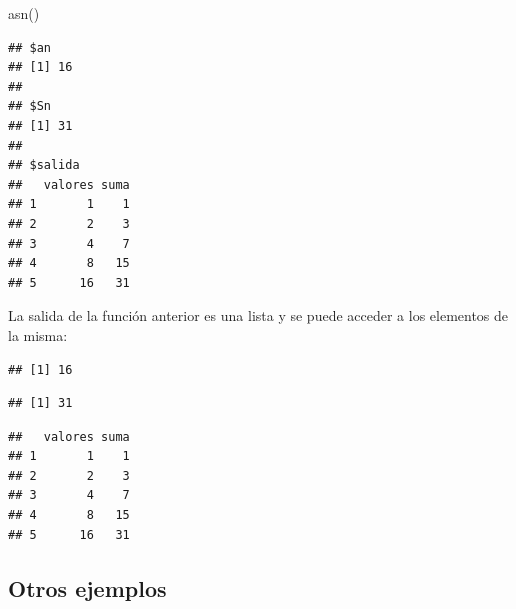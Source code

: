 \documentclass[
]{book}
\newenvironment{Shaded}{\begin{snugshade}}{\end{snugshade}}
\newcommand{\FunctionTok}[1]{\textcolor[rgb]{0.00,0.00,0.00}{#1}}
\newcommand{\NormalTok}[1]{#1}
\newcommand{\OtherTok}[1]{\textcolor[rgb]{0.56,0.35,0.01}{#1}}
\newcommand{\SpecialCharTok}[1]{\textcolor[rgb]{0.00,0.00,0.00}{#1}}
\theoremstyle{break}
\theoremstyle{nonumberplain}
\begin{document}
\begin{Shaded}
\begin{Highlighting}[]
\FunctionTok{asn}\NormalTok{()}
\end{Highlighting}
\end{Shaded}

\begin{verbatim}
## $an
## [1] 16
## 
## $Sn
## [1] 31
## 
## $salida
##   valores suma
## 1       1    1
## 2       2    3
## 3       4    7
## 4       8   15
## 5      16   31
\end{verbatim}

La salida de la función anterior es una lista y se puede
acceder a los elementos de la misma:

\begin{Shaded}
\end{Shaded}

\begin{verbatim}
## [1] 16
\end{verbatim}

\begin{Shaded}
\end{Shaded}

\begin{verbatim}
## [1] 31
\end{verbatim}

\begin{Shaded}
\end{Shaded}

\begin{verbatim}
##   valores suma
## 1       1    1
## 2       2    3
## 3       4    7
## 4       8   15
## 5      16   31
\end{verbatim}

\hypertarget{otros-ejemplos}{%
\subsection{Otros ejemplos}\label{otros-ejemplos}}
\end{document}
